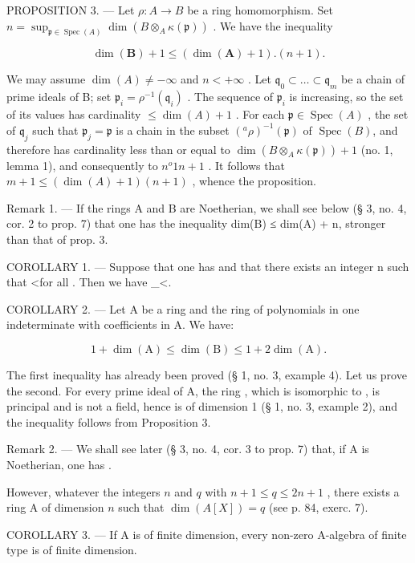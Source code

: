 PROPOSITION 3. --- Let \(\rho: A \to B\) be a ring homomorphism. Set \(n = \sup_{\mathfrak{p} \in \operatorname{Spec}(A)} \dim(B \otimes_A \kappa(\mathfrak{p}))\) . We have the inequality

\[
\dim (\mathbf {B}) + 1 \leqslant (\dim (\mathbf {A}) + 1). (n + 1).
\]

We may assume \(\dim(A) \neq -\infty\) and \(n < +\infty\) . Let \(\mathfrak{q}_0 \subset \ldots \subset \mathfrak{q}_m\) be a chain of prime ideals of B; set \(\mathfrak{p}_i = \rho^{-1}(\mathfrak{q}_i)\) . The sequence of \(\mathfrak{p}_i\) is increasing, so the set of its values has cardinality \(\leqslant \dim(A) + 1\) . For each \(\mathfrak{p} \in \operatorname{Spec}(A)\) , the set of \(\mathfrak{q}_j\) such that \(\mathfrak{p}_j = \mathfrak{p}\) is a chain in the subset \(({}^{a}\rho)^{-1}(\mathfrak{p})\) of \(\operatorname{Spec}(B)\), and therefore has cardinality less than or equal to \(\dim(B \otimes_A \kappa(\mathfrak{p})) + 1\) (no. 1, lemma 1), and consequently to \(n^o 1\)\(n + 1\) . It follows that \(m + 1 \leqslant (\dim(A) + 1)(n + 1)\) , whence the proposition.

Remark 1. --- If the rings A and B are Noetherian, we shall see below (§ 3, no. 4, cor. 2 to prop. 7) that one has the inequality dim(B) ≤ dim(A) + n, stronger than that of prop. 3.

COROLLARY 1. --- Suppose that one has  and that there exists an integer n such that \textless for all {}. Then we have \_\textless{}.

COROLLARY 2. --- Let A be a ring and {}{} the ring of polynomials in one indeterminate with coefficients in A. We have:

\[
1 + \dim (\mathrm{A}) \leqslant \dim (\mathrm{B}) \leqslant 1 + 2 \dim (\mathrm{A}).
\]

The first inequality has already been proved (§ 1, no. 3, example 4). Let us prove the second. For every prime ideal  of A, the ring {, which is isomorphic to }{}, is principal and is not a field, hence is of dimension 1 (§ 1, no. 3, example 2), and the inequality follows from Proposition 3.

Remark 2. --- We shall see later (§ 3, no. 4, cor. 3 to prop. 7) that, if A is Noetherian, one has {}{}.

However, whatever the integers \(n\) and \(q\) with \(n + 1 \leqslant q \leqslant 2n + 1\) , there exists a ring A of dimension \(n\) such that \(\dim(A[X]) = q\) (see p. 84, exerc. 7).

COROLLARY 3. --- If A is of finite dimension, every non-zero A-algebra of finite type is of finite dimension.

